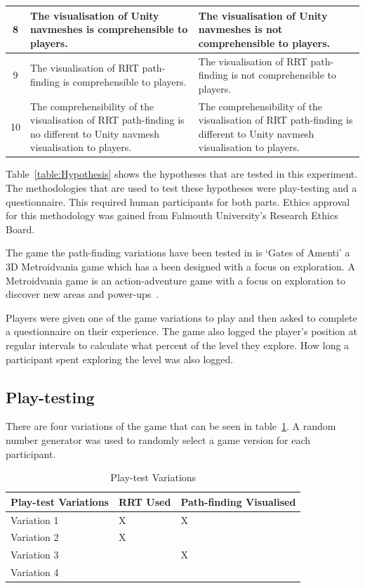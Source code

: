 \documentclass[journal]{IEEEtran}
\begin{document}
\begin{table}[h]
\begin{tabular}{|c|p{7.5cm}|p{7.5cm}|}
			8 &   The visualisation of  Unity navmeshes is comprehensible to players.
			&  The visualisation of  Unity navmeshes is not comprehensible to players.
			\\ \hline
			
			9 &  The visualisation of  RRT path-finding is comprehensible to players.
			&  The visualisation of  RRT path-finding is not comprehensible to players.
			\\ \hline
			
			10 &  The comprehensibility of the visualisation of RRT path-finding is no different to Unity navmesh visualisation to players.
			&  The comprehensibility of the visualisation of RRT path-finding is different to Unity navmesh visualisation to players.
			\\ \hline
		\end{tabular}
	\end{table}
	Table~\ref{table:Hypothesis} shows the hypotheses that are tested in this experiment. The methodologies that are used to test these hypotheses were play-testing and a questionnaire. This required human participants for both parts. Ethics approval for this methodology was gained from Falmouth University’s Research Ethics Board.
	
	The game the path-finding variations have been tested in is `Gates of Amenti' a 3D Metroidvania game which has a been designed with a focus on exploration. A Metroidvania game is an action-adventure game with a focus on exploration to discover new areas and power-ups~\cite{online:metroidvania}.
	
	Players were given one of the game variations to play and then asked to complete a questionnaire on their experience. The game also logged the player's position at regular intervals to calculate what percent of the level they explore. How long a participant spent exploring the level was also logged.
	
	\subsection{Play-testing}
	There are four variations of the game that can be seen in table~\ref{table:PlaytestVariations}.  A random number generator was used to randomly select a game version for each participant.
	
	\begin{table}[H]
		\centering
		\caption{Play-test Variations}
		\label{table:PlaytestVariations}
		\def\arraystretch{1.5}
		\begin{tabular}{ |l|l|l|}
			\hline
			\textbf{Play-test Variations} & \textbf{RRT Used}& \textbf{Path-finding Visualised} \\ \hline
			Variation 1  &  X & X \\ \hline
			Variation 2  &  X &  \\ \hline
			Variation 3  &    & X \\ \hline
			Variation 4  &    &  \\ \hline
		\end{tabular}
	\end{table}
	
\end{document}
